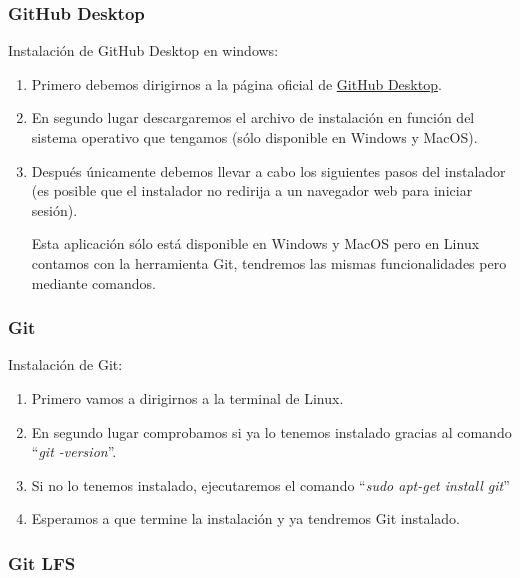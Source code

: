 \subsubsection{GitHub Desktop}

Instalación de GitHub Desktop en windows:

\begin{enumerate}
\item
	Primero debemos dirigirnos a la página oficial de \href{https://desktop.github.com/}{GitHub Desktop}.
\item
	En segundo lugar descargaremos el archivo de instalación en función del sistema operativo que tengamos (sólo disponible en Windows y MacOS).
\item 
	Después únicamente debemos llevar a cabo los siguientes pasos del instalador (es posible que el instalador no redirija a un navegador web para iniciar sesión).

Esta aplicación sólo está disponible en Windows y MacOS pero en Linux contamos con la herramienta Git, tendremos las mismas funcionalidades pero mediante comandos.
\end{enumerate}

\subsubsection{Git}

Instalación de Git:

\begin{enumerate}
    \item Primero vamos a dirigirnos a la terminal de Linux.
    \item En segundo lugar comprobamos si ya lo tenemos instalado gracias al comando ``\textit{git -version}''.
    \item Si no lo tenemos instalado, ejecutaremos el comando ``\textit{sudo apt-get install git}''
    \item Esperamos a que termine la instalación y ya tendremos Git instalado.
\end{enumerate}

\subsubsection{Git LFS}

